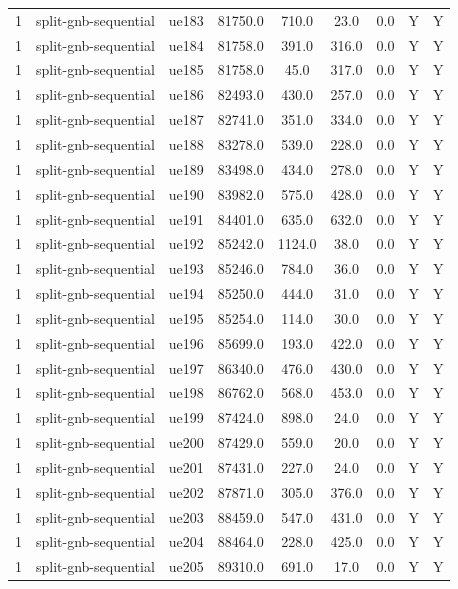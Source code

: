 \begin{table}[ht]
\begin{tabular}{|c|c|c|c|c|c|c|c|c|}
1 & split-gnb-sequential & ue183 & 81750.0 & 710.0 & 23.0 & 0.0 & Y & Y \\
1 & split-gnb-sequential & ue184 & 81758.0 & 391.0 & 316.0 & 0.0 & Y & Y \\
1 & split-gnb-sequential & ue185 & 81758.0 & 45.0 & 317.0 & 0.0 & Y & Y \\
1 & split-gnb-sequential & ue186 & 82493.0 & 430.0 & 257.0 & 0.0 & Y & Y \\
1 & split-gnb-sequential & ue187 & 82741.0 & 351.0 & 334.0 & 0.0 & Y & Y \\
1 & split-gnb-sequential & ue188 & 83278.0 & 539.0 & 228.0 & 0.0 & Y & Y \\
1 & split-gnb-sequential & ue189 & 83498.0 & 434.0 & 278.0 & 0.0 & Y & Y \\
1 & split-gnb-sequential & ue190 & 83982.0 & 575.0 & 428.0 & 0.0 & Y & Y \\
1 & split-gnb-sequential & ue191 & 84401.0 & 635.0 & 632.0 & 0.0 & Y & Y \\
1 & split-gnb-sequential & ue192 & 85242.0 & 1124.0 & 38.0 & 0.0 & Y & Y \\
1 & split-gnb-sequential & ue193 & 85246.0 & 784.0 & 36.0 & 0.0 & Y & Y \\
1 & split-gnb-sequential & ue194 & 85250.0 & 444.0 & 31.0 & 0.0 & Y & Y \\
1 & split-gnb-sequential & ue195 & 85254.0 & 114.0 & 30.0 & 0.0 & Y & Y \\
1 & split-gnb-sequential & ue196 & 85699.0 & 193.0 & 422.0 & 0.0 & Y & Y \\
1 & split-gnb-sequential & ue197 & 86340.0 & 476.0 & 430.0 & 0.0 & Y & Y \\
1 & split-gnb-sequential & ue198 & 86762.0 & 568.0 & 453.0 & 0.0 & Y & Y \\
1 & split-gnb-sequential & ue199 & 87424.0 & 898.0 & 24.0 & 0.0 & Y & Y \\
1 & split-gnb-sequential & ue200 & 87429.0 & 559.0 & 20.0 & 0.0 & Y & Y \\
1 & split-gnb-sequential & ue201 & 87431.0 & 227.0 & 24.0 & 0.0 & Y & Y \\
1 & split-gnb-sequential & ue202 & 87871.0 & 305.0 & 376.0 & 0.0 & Y & Y \\
1 & split-gnb-sequential & ue203 & 88459.0 & 547.0 & 431.0 & 0.0 & Y & Y \\
1 & split-gnb-sequential & ue204 & 88464.0 & 228.0 & 425.0 & 0.0 & Y & Y \\
1 & split-gnb-sequential & ue205 & 89310.0 & 691.0 & 17.0 & 0.0 & Y & Y \\

\end{tabular}
\end{table}
